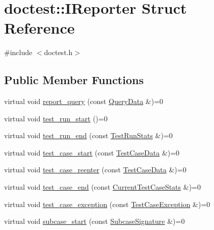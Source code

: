 \hypertarget{structdoctest_1_1_i_reporter}{}\section{doctest\+:\+:I\+Reporter Struct Reference}
\label{structdoctest_1_1_i_reporter}


{\ttfamily \#include $<$doctest.\+h$>$}

\subsection*{Public Member Functions}
\begin{DoxyCompactItemize}
\item 
virtual void \hyperlink{structdoctest_1_1_i_reporter_ae7e30d1c2cd332094c66d39bf3a85e52}{report\+\_\+query} (const \hyperlink{structdoctest_1_1_query_data}{Query\+Data} \&)=0
\item 
virtual void \hyperlink{structdoctest_1_1_i_reporter_a7f4a4b654726d4b266c91cc0e1569f96}{test\+\_\+run\+\_\+start} ()=0
\item 
virtual void \hyperlink{structdoctest_1_1_i_reporter_a610495b7caa29e36b5ea62bff62952ed}{test\+\_\+run\+\_\+end} (const \hyperlink{structdoctest_1_1_test_run_stats}{Test\+Run\+Stats} \&)=0
\item 
virtual void \hyperlink{structdoctest_1_1_i_reporter_afa107df2d0230607e2f86f1876f48526}{test\+\_\+case\+\_\+start} (const \hyperlink{structdoctest_1_1_test_case_data}{Test\+Case\+Data} \&)=0
\item 
virtual void \hyperlink{structdoctest_1_1_i_reporter_a46c2fe41e5fa3d6930a3cb26d81ed764}{test\+\_\+case\+\_\+reenter} (const \hyperlink{structdoctest_1_1_test_case_data}{Test\+Case\+Data} \&)=0
\item 
virtual void \hyperlink{structdoctest_1_1_i_reporter_a43f8f19681dd5d42218ecb4fd935cda7}{test\+\_\+case\+\_\+end} (const \hyperlink{structdoctest_1_1_current_test_case_stats}{Current\+Test\+Case\+Stats} \&)=0
\item 
virtual void \hyperlink{structdoctest_1_1_i_reporter_a40b0cdf1ad59dabc736e35fde63d516f}{test\+\_\+case\+\_\+exception} (const \hyperlink{structdoctest_1_1_test_case_exception}{Test\+Case\+Exception} \&)=0
\item 
virtual void \hyperlink{structdoctest_1_1_i_reporter_a03ef82d6fb9afe8b0e3bbe24f28dd268}{subcase\+\_\+start} (const \hyperlink{structdoctest_1_1_subcase_signature}{Subcase\+Signature} \&)=0
\item 

\end{DoxyCompactItemize}
